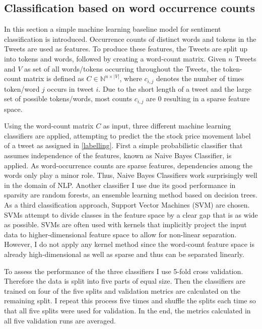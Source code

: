 \documentclass[a4paper,12pt]{article}%
\begin{document}
\subsection{Classification based on word occurrence counts \label{baseline_ml}}
In this section a simple machine learning baseline model for sentiment classification is introduced. Occurrence counts of distinct words and tokens in the Tweets are used as features. To produce these features, the Tweets are split up into tokens and words, followed by creating a word-count matrix. Given $n$ Tweets and $V$ as set of all words/tokens occurring throughout the Tweets, the token-count matrix is defined as $C \in \mathbb{N}^{n \times |V|}$, where $c_{i,j}$ denotes the number of times token/word $j$ occurs in tweet $i$.  Due to the short length of a tweet and the large set of possible tokens/words, most counts $c_{i,j}$ are 0 resulting in a sparse feature space.

Using the word-count matrix $C$ as input, three different machine learning classifiers are applied, attempting to predict the the stock price movement label of a tweet as assigned in \ref{labelling}. First a simple probabilistic classifier that assumes independence of the features, known as Naive Bayes Classifier, is applied. As word-occurrence counts are sparse features, dependencies among the words only play a minor role. Thus, Naive Bayes Classifiers work surprisingly well in the domain of NLP. Another classifier I use due its good performance in sparsity are random forests, an ensemble learning method based on decision trees. As a third classification approach, Support Vector Machines (SVM) are chosen. SVMs attempt to divide classes in the feature space by a clear gap that is as wide as possible. SVMs are often used with kernels that implicitly project the input data to higher-dimensional feature space to allow for non-linear separation. However, I do not apply any kernel method since the word-count feature space is already high-dimensional as well as sparse and thus can be separated linearly.

To assess the performance of the three classifiers I use 5-fold cross validation. Therefore the data is split into five parts of equal size. Then the classifiers are trained on four of the five splits and validation metrics are calculated on the remaining split. I repeat this process five times and shuffle the splits each time so that all five splits were used for validation. In the end, the metrics calculated in all five validation runs are averaged. 
\end{document}
